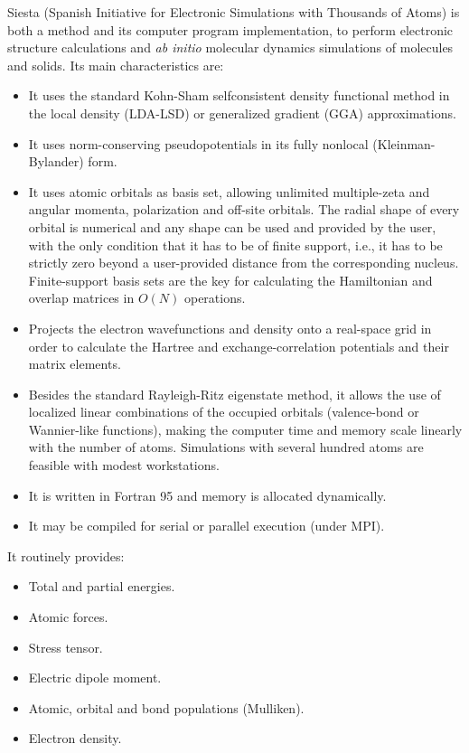 \documentclass[11pt]{article}
\begin{document}
{\sc Siesta} (Spanish Initiative for 
Electronic Simulations with
Thousands of Atoms) is both a method and its computer program implementation,
to perform electronic structure calculations and {\it ab initio} molecular 
dynamics simulations of molecules and solids. Its main characteristics are:
\begin{itemize}
\item
It uses the standard Kohn-Sham selfconsistent density functional
method in the local density (LDA-LSD) or generalized gradient (GGA)
approximations.
\item
It uses norm-conserving pseudopotentials in its fully nonlocal
(Kleinman-Bylander) form.
\item
It uses atomic orbitals as basis set, allowing unlimited multiple-zeta
and angular momenta, polarization and off-site orbitals. The radial
shape of every orbital is numerical and any shape can be used and provided 
by the user, with the only condition that it has to be of finite support,
i.e., it has to be strictly zero beyond a user-provided distance from the 
corresponding nucleus.
Finite-support basis sets are the key for calculating the Hamiltonian 
and overlap matrices in $O(N)$ operations.
\item
Projects the electron wavefunctions and density onto a real-space
grid in order to calculate the Hartree and exchange-correlation
potentials and their matrix elements.
\item
Besides the standard Rayleigh-Ritz eigenstate method, it allows
the use of localized linear combinations of the occupied orbitals
(valence-bond or Wannier-like functions), making the computer
time and memory scale linearly with the number of atoms.
Simulations with several hundred atoms are feasible with
modest workstations.
\item
It is written in Fortran 95 and memory is allocated dynamically.  
\item
It may be compiled for serial or parallel execution (under MPI).

\end{itemize}

It routinely provides:
\begin{itemize}
\item Total and partial energies.
\item Atomic forces.
\item Stress tensor.
\item Electric dipole moment.
\item Atomic, orbital and bond populations (Mulliken).
\item Electron density.
\end{itemize}
\end{document}
